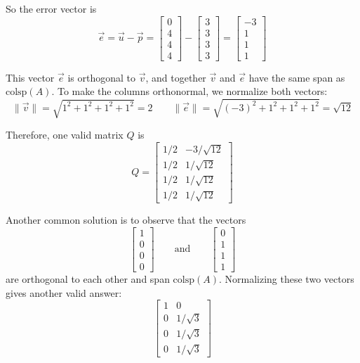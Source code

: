 \documentclass[11pt]{article}
\begin{document}
\begin{prob}
\begin{subprob}
\begin{solution}
So the error vector is
\[
\vec e = \vec u - \vec p
=
\begin{bmatrix} 0 \\ 4 \\ 4 \\ 4 \end{bmatrix}
-
\begin{bmatrix} 3 \\ 3 \\ 3 \\ 3 \end{bmatrix}
=
\begin{bmatrix} -3 \\ 1 \\ 1 \\ 1 \end{bmatrix}
\]

This vector $\vec e$ is orthogonal to $\vec v$, and together $\vec v$ and $\vec e$ have the same span as $\text{colsp}(A)$. To make the columns orthonormal, we normalize both vectors:
\[
\|\vec v\| = \sqrt{1^2+1^2+1^2+1^2} = 2
\qquad
\|\vec e\| = \sqrt{(-3)^2+1^2+1^2+1^2} = \sqrt{12}
\]

Therefore, one valid matrix $Q$ is
\[
\boxed{
Q=
\begin{bmatrix}
1/2 & -3/\sqrt{12} \\
1/2 & 1/\sqrt{12} \\
1/2 & 1/\sqrt{12} \\
1/2 & 1/\sqrt{12}
\end{bmatrix}
}
\]

Another common solution is to observe that the vectors
\[
\begin{bmatrix} 1 \\ 0 \\ 0 \\ 0 \end{bmatrix}
\qquad \text{and} \qquad
\begin{bmatrix} 0 \\ 1 \\ 1 \\ 1 \end{bmatrix}
\]
are orthogonal to each other and span $\text{colsp}(A)$. Normalizing these two vectors gives another valid answer:
\[
\boxed{
\begin{bmatrix}
1 & 0 \\
0 & 1/\sqrt{3} \\
0 & 1/\sqrt{3} \\
0 & 1/\sqrt{3}
\end{bmatrix}
}
\]
\end{solution}
\end{subprob}


\end{prob}
\end{document}
